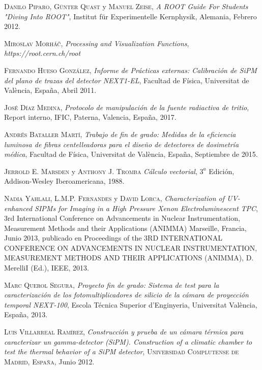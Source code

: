 \begin{thebibliography}{99}
 \textsc{Danilo Piparo}, \textsc{Günter Quast} y \textsc{Manuel Zeise},
\textit{A ROOT Guide For Students "Diving Into ROOT"}, Institut für Experimentelle Kernphysik, Alemania, Febrero 2012.

 \textsc{Miroslav Morháč},
\textit{Processing and Visualization Functions}, \textit{https://root.cern.ch/root}

 \textsc{Fernando Hueso González},
\textit{Informe de  Prácticas externas: Calibración de SiPM del plano de trazas del detector NEXT1-EL}, Facultad de Física, Universitat de  València, España, Abril 2011.

 \textsc{José Díaz Medina},
\textit{Protocolo de manipulación de la fuente radiactiva de tritio}, Report interno, IFIC, Paterna, Valencia, España, 2017.

 \textsc{Andrés Bataller Martí},
\textit{Trabajo de fin de grado: Medidas de la eficiencia luminosa de fibras centelleadoras para el diseño de detectores de dosimetría médica}, Facultad de Física, Universitat de València, España, Septiembre de 2015.

 \textsc{Jerrold E. Marsden} y \textsc{Anthony J. Tromba}
\textit{Cálculo vectorial}, $3^a$ Edición, Addison-Wesley Iberoamericana, 1988.

 \textsc{Nadia Yahlali}, \textsc{L.M.P. Fernandes} y \textsc{David Lorca},
\textit{Characterization of UV-enhanced SIPMs for Imaging in a High Pressure Xenon Electroluminescent TPC}, 
 3rd International Conference on Advancements in Nuclear Instrumentation, Measurement Methods and their Applications (ANIMMA)  Marseille, Francia, Junio 2013, publicado en Proceedings of the 3RD INTERNATIONAL CONFERENCE ON ADVANCEMENTS IN NUCLEAR INSTRUMENTATION, MEASUREMENT METHODS AND THEIR APPLICATIONS (ANIMMA), D. MerelliI (Ed.), IEEE, 2013.



 \textsc{Marc Querol Segura},
\textit{Proyecto fin de grado: Sistema de test para la caracterización de los fotomultiplicadores de silicio de la cámara de proyección temporal NEXT-100}, Escola Técnica Superior d'Enginyeria, Universitat València, España, 2013.

 \textsc{Luis Villarreal Ramírez},
\textit{Construcción y prueba de un cámara térmica para caracterizar un gamma-detector (SiPM). Construction of a climatic chamber to test the thermal behavior of a SiPM detector}, \textsc{Universidad Complutense de Madrid, España}, Junio 2012.
 
\end{thebibliography}